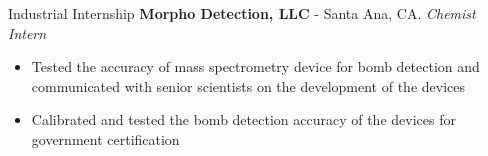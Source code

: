 \begin{rubric}{Industrial Internship}
  \textbf{Morpho Detection, LLC} - Santa Ana, CA.
  \textit{Chemist Intern}
  \vspace{-0.5em}
  \begin{itemize}
    \itemsep-0.5em
  \item Tested the accuracy of mass spectrometry device for bomb detection and communicated
    with senior scientists on the development of the devices
  \item Calibrated and tested the bomb detection accuracy of the devices for
    government certification
  \vspace{-2em}
  \end{itemize}
%
%
%
\end{rubric}

